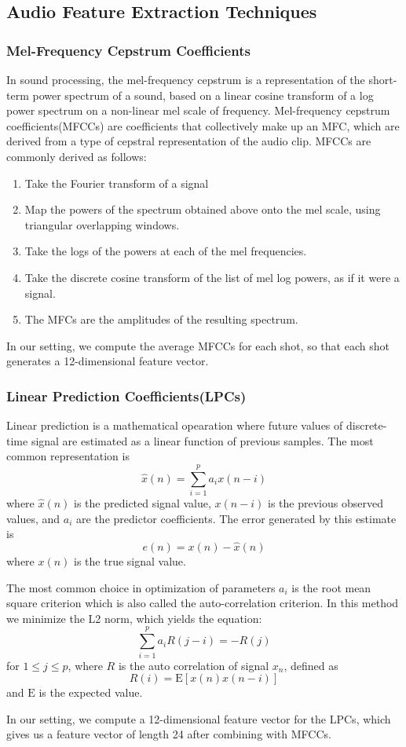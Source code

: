 \documentclass{article}
\begin{document}
\subsection{Audio Feature Extraction Techniques}
\subsubsection{Mel-Frequency Cepstrum Coefficients}
In sound processing, the mel-frequency cepstrum is a representation of the short-term power spectrum of a sound, based on a linear cosine transform of a log power spectrum on a non-linear mel scale of frequency. Mel-frequency cepstrum coefficients(MFCCs) are coefficients that collectively make up an MFC, which are derived from a type of cepstral representation of the audio clip. MFCCs are commonly derived as follows:
\begin{enumerate}
\item Take the Fourier transform of a signal
\item Map the powers of the spectrum obtained above onto the mel scale, using triangular overlapping windows.
\item Take the logs of the powers at each of the mel frequencies.
\item Take the discrete cosine transform of the list of mel log powers, as if it were a signal.
\item The MFCs are the amplitudes of the resulting spectrum.
\end{enumerate}
In our setting, we compute the average MFCCs for each shot, so that each shot generates a 12-dimensional feature vector.
\subsubsection{Linear Prediction Coefficients(LPCs)}
Linear prediction is a mathematical opearation where future values of discrete-time signal are estimated as a linear function of previous samples. The most common representation is 
$$ \hat{x}(n) = \sum_{i=1}^{p} a_i x(n-i)$$
where $\hat{x}(n)$ is the predicted signal value, $x(n-i)$ is the previous observed values, and $a_i$ are the predictor coefficients. The error generated by this estimate is 
$$ e(n) = x(n) - \hat{x}(n)$$
where $x(n)$ is the true signal value. \par
The most common choice in optimization of parameters $a_i$ is the root mean square criterion which is also called the auto-correlation criterion. In this method we minimize the L2 norm, which yields the equation:
$$\sum_{i=1}^{p} a_i R(j-i) = -R(j)$$
for $1 \leq j \leq p$, where $R$ is the auto correlation of signal $x_n$, defined as
$$R(i) = \mathrm{E}[x(n)x(n-i)]$$
and $\mathrm{E}$ is the expected value.\par
In our setting, we compute a 12-dimensional feature vector for the LPCs, which gives us a feature vector of length 24 after combining with MFCCs.
\end{document}
